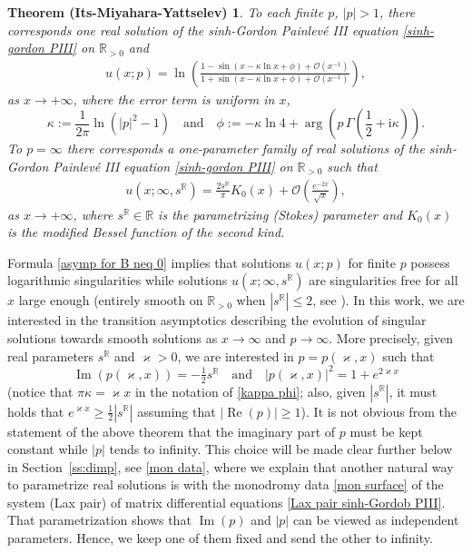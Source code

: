 \documentclass[a4paper,10pt,leqno]{amsart}
\numberwithin{equation}{subsection}
\theoremstyle{plain}
\theoremstyle{definition}
\newtheorem*{IMY}{Theorem (Its-Miyahara-Yattselev)}
\theoremstyle{remark}
\theoremstyle{case}
\newcommand{\R}{\mathbb R}
\newcommand{\ii}{\mathrm{i}}
\renewcommand{\O}{\mathcal{O}}
\renewcommand{\Re}{\operatorname{Re}}
\renewcommand{\Im}{\operatorname{Im}}
\begin{document}
\begin{tcolorbox}[colback=white,colframe=gray]
\begin{IMY}
\label{IMY main thm}
\it
To each finite \( p \), \( |p|>1 \), there corresponds one real solution of the sinh-Gordon Painlev\'e III equation \eqref{sinh-gordon PIII} on \( \R_{>0} \) and
\begin{align}
\label{asymp for B neq 0}
    u(x;p) = \ln \left(\frac{1 - \sin \left( x - \kappa\ln x + \phi \right)+\O(x^{-1})}{1 + \sin \left( x - \kappa\ln x + \phi \right)+\O(x^{-1})} \right), 
\end{align}
as $x \to +\infty$, where the error term is uniform in \( x \),
\begin{equation}
\label{kappa phi}
\kappa := \frac{1}{2 \pi} \ln ( |p|^2 - 1 ) \quad \text{and} \quad 
\phi := -\kappa \ln 4 + \arg \left( p\,\Gamma\left(\frac12+\ii\kappa\right) \right).
\end{equation}
To \( p=\infty \) there corresponds a one-parameter family of real solutions of the sinh-Gordon Painlev\'e III equation \eqref{sinh-gordon PIII} on \( \R_{>0} \) such that 
\begin{align}
    u(x;\infty,s^\R) = \frac{2s^\R}\pi K_0(x) + \O\left(\frac{e^{-2x}}{\sqrt{x}} \right),
    \label{exp decay}
\end{align}
as \( x\to+\infty \), where \( s^\R\in\R \) is the parametrizing (Stokes) parameter and \( K_0(x) \) is the modified Bessel function of the second kind.
\end{IMY}
\end{tcolorbox}

Formula \eqref{asymp for B neq 0} implies that solutions \( u(x;p) \) for finite \( p \) possess logarithmic singularities while solutions \( u(x;\infty,s^\R) \) are singularities free for all \( x \) large enough (entirely smooth on \(\R_{>0}\) when \(|s^\R|\leq 2\), see \cite{GIL2,GIL4}). In this work, we are interested in the transition asymptotics describing the evolution of singular solutions towards smooth solutions as \( x\to\infty \) and \( p \to \infty \). More precisely, given real parameters \( s^\R \) and \( \varkappa>0 \), we are interested in \( p=p(\varkappa,x)\) such that
\begin{equation}
\label{asymp regime}
\Im(p(\varkappa,x)) = -\tfrac12s^\R \quad \text{and} \quad |p(\varkappa,x)|^2 = 1+ e^{2\varkappa x}
\end{equation}
(notice that \( \pi\kappa=\varkappa x\) in the notation of \eqref{kappa phi}; also, given \( |s^\R|\), it must holds that \( e^{\varkappa x}\geq \frac12 |s^\R| \) assuming that \( |\Re(p)|\geq 1\)). It is not obvious from the statement of the above theorem that the imaginary part of \( p \) must be kept constant while \( |p| \) tends to infinity. This choice will be made clear further below in Section~\ref{ss:dimp}, see \eqref{mon data}, where we explain that another natural way to parametrize real solutions is with the monodromy data \eqref{mon surface} of the system  (Lax pair) of matrix differential equations \eqref{Lax pair sinh-Gordob PIII}. That parametrization shows that \( \Im(p)\) and \( |p|\) can be viewed as independent parameters. Hence, we keep one of them fixed and send the other to infinity.
\end{document}
